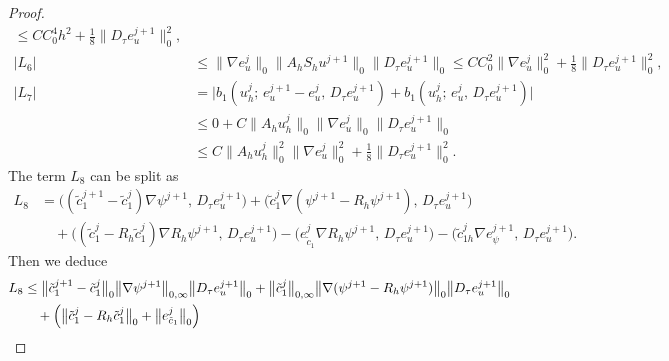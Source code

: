\documentclass[a4paper,fleqn]{cas-sc}
\numberwithin{equation}{section}
\theoremstyle{definition}
\begin{document}
\begin{proof}
\begin{align}
           \leq CC_{0}^{4}h^{2}
              + \frac{1}{8}\bigl\|D_{\tau}e_{u}^{j+1}\bigr\|_{0}^{2},
  \label{eq:4.60}\\[4pt]
  |L_{6}| &\leq \bigl\|\nabla e_{u}^{j}\bigr\|_{0}
                \bigl\|A_{h}S_{h}u^{j+1}\bigr\|_{0}
                \bigl\|D_{\tau}e_{u}^{j+1}\bigr\|_{0}
           \leq CC_{0}^{2}\bigl\|\nabla e_{u}^{j}\bigr\|_{0}^{2}
              + \frac{1}{8}\bigl\|D_{\tau}e_{u}^{j+1}\bigr\|_{0}^{2},
  \label{eq:4.61}\\[4pt]
  |L_{7}| &= \bigl|b_{1}(u_{h}^{j};\, e_{u}^{j+1} - e_{u}^{j},\, D_{\tau}e_{u}^{j+1})
              + b_{1}(u_{h}^{j};\, e_{u}^{j},\, D_{\tau}e_{u}^{j+1})\bigr|
  \nonumber\\
          &\leq 0
             + C\bigl\|A_{h}u_{h}^{j}\bigr\|_{0}
               \bigl\|\nabla e_{u}^{j}\bigr\|_{0}
               \bigl\|D_{\tau}e_{u}^{j+1}\bigr\|_{0}
  \nonumber\\
          &\leq C\bigl\|A_{h}u_{h}^{j}\bigr\|_{0}^{2}
               \bigl\|\nabla e_{u}^{j}\bigr\|_{0}^{2}
             + \frac{1}{8}\bigl\|D_{\tau}e_{u}^{j+1}\bigr\|_{0}^{2}.
  \label{eq:4.62}
\end{align}
The term $L_{8}$ can be split as
\begin{align}
  L_{8} &= \bigl((\tilde{c}_{1}^{j+1} - \tilde{c}_{1}^{j})\nabla\psi^{j+1},\,
                 D_{\tau}e_{u}^{j+1}\bigr)
          + \bigl(\tilde{c}_{1}^{j}\nabla(\psi^{j+1} - R_{h}\psi^{j+1}),\,
                 D_{\tau}e_{u}^{j+1}\bigr)
  \nonumber\\
  &\quad + \bigl((\tilde{c}_{1}^{j} - R_{h}\tilde{c}_{1}^{j})\nabla R_{h}\psi^{j+1},\,
                 D_{\tau}e_{u}^{j+1}\bigr)
          - \bigl(e_{\tilde{c}_{1}}^{j}\nabla R_{h}\psi^{j+1},\,
                 D_{\tau}e_{u}^{j+1}\bigr)
          - \bigl(\tilde{c}_{1h}^{j}\nabla e_{\psi}^{j+1},\,
                 D_{\tau}e_{u}^{j+1}\bigr).
  \label{eq:4.63}
\end{align}
Then we deduce
\begin{align}
  L_{8}
  &\leq \bigl\|\tilde{c}_{1}^{j+1} - \tilde{c}_{1}^{j}\bigr\|_{0}
         \bigl\|\nabla\psi^{j+1}\bigr\|_{0,\infty}
         \bigl\|D_{\tau}e_{u}^{j+1}\bigr\|_{0}
       + \bigl\|\tilde{c}_{1}^{j}\bigr\|_{0,\infty}
         \bigl\|\nabla(\psi^{j+1} - R_{h}\psi^{j+1})\bigr\|_{0}
         \bigl\|D_{\tau}e_{u}^{j+1}\bigr\|_{0}
  \nonumber\\
  &\quad + \Bigl(\bigl\|\tilde{c}_{1}^{j} - R_{h}\tilde{c}_{1}^{j}\bigr\|_{0}
               + \bigl\|e_{\tilde{c}_{1}}^{j}\bigr\|_{0}\Bigr)

\end{align}
\end{proof}
\end{document}
